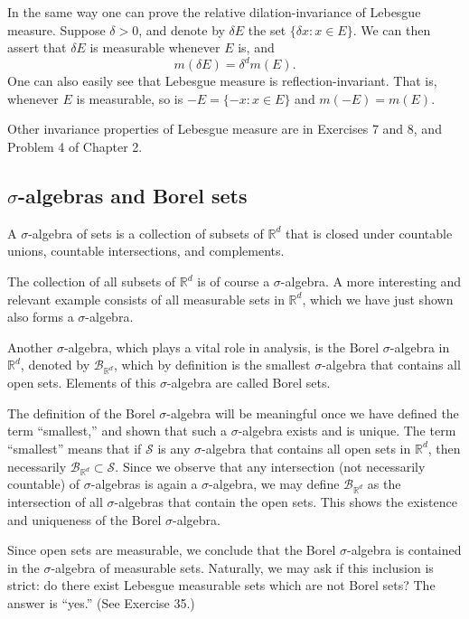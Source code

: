 \documentclass[11pt,openany]{book}
\begin{document}
In the same way one can prove the relative dilation-invariance of Lebesgue measure. Suppose $\delta>0$, and denote by $\delta E$ the set $\{\delta x:x\in E\}$. We can then assert that $\delta E$ is measurable whenever $E$ is, and
\[
 m(\delta E)=\delta^d m(E).
\]
One can also easily see that Lebesgue measure is reflection-invariant. That is, whenever $E$ is measurable, so is $-E=\{-x:x\in E\}$ and $m(-E)=m(E)$.

Other invariance properties of Lebesgue measure are in Exercises 7 and 8, and Problem 4 of Chapter 2.

\subsection*{$\sigma$-algebras and Borel sets}

A $\sigma$-algebra of sets is a collection of subsets of $\mathbb{R}^d$ that is closed under countable unions, countable intersections, and complements.

The collection of all subsets of $\mathbb{R}^d$ is of course a $\sigma$-algebra. A more interesting and relevant example consists of all measurable sets in $\mathbb{R}^d$, which we have just shown also forms a $\sigma$-algebra.

Another $\sigma$-algebra, which plays a vital role in analysis, is the Borel $\sigma$-algebra in $\mathbb{R}^d$, denoted by $\mathcal B_{\mathbb{R}^d}$, which by definition is the smallest $\sigma$-algebra that contains all open sets. Elements of this $\sigma$-algebra are called Borel sets.

The definition of the Borel $\sigma$-algebra will be meaningful once we have defined the term ``smallest,'' and shown that such a $\sigma$-algebra exists and is unique. The term ``smallest'' means that if $\mathcal S$ is any $\sigma$-algebra that contains all open sets in $\mathbb{R}^d$, then necessarily $\mathcal B_{\mathbb{R}^d}\subset\mathcal S$. Since we observe that any intersection (not necessarily countable) of $\sigma$-algebras is again a $\sigma$-algebra, we may define $\mathcal B_{\mathbb{R}^d}$ as the intersection of all $\sigma$-algebras that contain the open sets. This shows the existence and uniqueness of the Borel $\sigma$-algebra.

Since open sets are measurable, we conclude that the Borel $\sigma$-algebra is contained in the $\sigma$-algebra of measurable sets. Naturally, we may ask if this inclusion is strict: do there exist Lebesgue measurable sets which are not Borel sets? The answer is ``yes.'' (See Exercise 35.)
\end{document}
